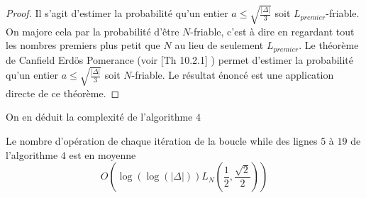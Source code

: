 \begin{proof}
	Il s'agit d'estimer la probabilité qu'un entier $a \leq \sqrt{\frac{|\Delta|}{3}}$ soit $L_{premier}$-friable. On majore cela par la probabilité d'être $N$-friable, c'est à dire en regardant tout les nombres premiers plus petit que $N$ au lieu de seulement $L_{premier}$. Le théorème de Canfield Erdös Pomerance (voir  \cite{Coh00}[Th 10.2.1] ) permet d'estimer la probabilité qu'un entier $a \leq \sqrt{\frac{|\Delta|}{3}}$ soit $N$-friable. Le résultat énoncé est une application directe de ce théorème.
\end{proof}

On en déduit la complexité de l'algorithme $4$

\begin{Prop}
	Le nombre d'opération de chaque itération de la boucle while des lignes $5$ à $19$ de l'algorithme $4$ est en moyenne 
	\begin{equation*}
		O\left(\log(\log(|\Delta|))L_{N}\left( \frac{1}{2},\frac{\sqrt{2}}{2}\right) \right) 
	\end{equation*}
\end{Prop}

